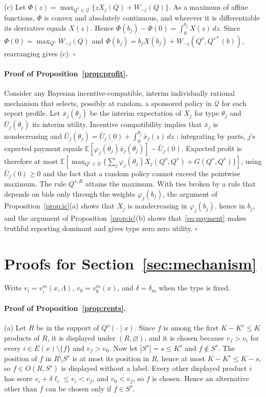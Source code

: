 \documentclass[opre,dblanonrev]{informs4}
\providecommand{\E}{\mathbb{E}}
\providecommand{\1}{\mathbf{1}}
\begin{document}
\begin{APPENDICES}
(c) Let $\Phi(z)=\max_{Q^s\in\mathcal Q}\{zX_j(Q)+W_{-j}(Q)\}$. As a maximum of affine functions, $\Phi$ is convex and absolutely continuous, and wherever it is differentiable its derivative equals $X(z)$. Hence $\Phi(b_j)-\Phi(0)=\int_0^{b_j}X(z)\,dz$. Since $\Phi(0)=\max_{Q^s}W_{-j}(Q)$ and $\Phi(b_j)=b_jX(b_j)+W_{-j}(Q^o,Q^{s\ast}(b))$, rearranging gives (c). \hfill$\square$

\paragraph{Proof of Proposition~\ref{prop:profit}.}
Consider any Bayesian incentive-compatible, interim individually rational mechanism that selects, possibly at random, a sponsored policy in $\mathcal Q$ for each report profile. Let $\bar x_j(\theta_j)$ be the interim expectation of $X_j$ for type $\theta_j$ and $\bar U_j(\theta_j)$ its interim utility. Incentive compatibility implies that $\bar x_j$ is nondecreasing and $\bar U_j(\theta_j)=\bar U_j(0)+\int_0^{\theta_j}\bar x_j(z)\,dz$ \citep{myerson1981optimal}; integrating by parts, $j$'s expected payment equals $\E[\varphi_j(\theta_j)\bar x_j(\theta_j)]-\bar U_j(0)$. Expected profit is therefore at most $\E[\max_{Q^s\in\mathcal Q}\{\sum_j\varphi_j(\theta_j)X_j(Q^o,Q^s)+G(Q^o,Q^s)\}]$, using $\bar U_j(0)\ge0$ and the fact that a random policy cannot exceed the pointwise maximum. The rule $Q^{s,R}$ attains the maximum. With ties broken by a rule that depends on bids only through the weights $\varphi_j(b_j)$, the argument of Proposition~\ref{prop:ic}(a) shows that $X_j$ is nondecreasing in $\varphi_j(b_j)$, hence in $b_j$, and the argument of Proposition~\ref{prop:ic}(b) shows that~\eqref{eq:payment} makes truthful reporting dominant and gives type zero zero utility. \hfill$\square$

\section{Proofs for Section~\ref{sec:mechanism}}\label{app:mechanism}

Write $v_i=v_i^m(x,\Lambda)$, $v_0=v_0^m(x)$, and $\delta=\delta_m$ when the type is fixed.

\paragraph{Proof of Proposition~\ref{prop:rents}.}
(a) Let $R$ be in the support of $Q^o(\cdot\mid x)$. Since $f$ is among the first $K-K^s\le K$ products of $R$, it is displayed under $(R,\varnothing)$, and it is chosen because $v_f>v_i$ for every $i\in E(x)\setminus\{f\}$ and $v_f>v_0$. Now let $|S^s|=s\le K^s$ and $f\notin S^s$. The position of $f$ in $R\setminus S^s$ is at most its position in $R$, hence at most $K-K^s\le K-s$, so $f\in O(R,S^s)$ is displayed without a label. Every other displayed product $i$ has score $v_i+\delta\ell_i\le v_i<v_f$, and $v_0<v_f$, so $f$ is chosen. Hence an alternative other than $f$ can be chosen only if $f\in S^s$.


\end{APPENDICES}
\end{document}
